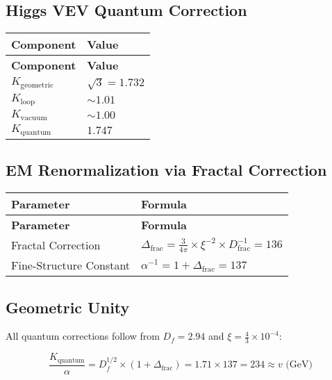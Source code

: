 \documentclass[12pt,a4paper]{article}
\begin{document}
	\subsection{Higgs VEV Quantum Correction}
	
	\begin{longtable}{|p{3cm}|p{4cm}|}
		\hline
		\textbf{Component} & \textbf{Value} \\
		\hline
		\endfirsthead
		\hline
		\textbf{Component} & \textbf{Value} \\
		\hline
		\endhead
		\(K_{\text{geometric}}\) & \(\sqrt{3} = 1.732\) \\
		\hline
		\(K_{\text{loop}}\) & \(\sim 1.01\) \\
		\hline
		\(K_{\text{vacuum}}\) & \(\sim 1.00\) \\
		\hline
		\(K_{\text{quantum}}\) & \(1.747\) \\
		\hline
	\end{longtable}
	
	\subsection{EM Renormalization via Fractal Correction}
	
	\begin{longtable}{|p{4cm}|p{5cm}|}
		\hline
		\textbf{Parameter} & \textbf{Formula} \\
		\hline
		\endfirsthead
		\hline
		\textbf{Parameter} & \textbf{Formula} \\
		\hline
		\endhead
		Fractal Correction & \(\Delta_{\text{frac}} = \frac{3}{4\pi} \times \xi^{-2} \times D_{\text{frac}}^{-1} = 136\) \\
		\hline
		Fine-Structure Constant & \(\alpha^{-1} = 1 + \Delta_{\text{frac}} = 137\) \\
		\hline
	\end{longtable}
	
	\subsection{Geometric Unity}
	
	All quantum corrections follow from \(D_f = 2.94\) and \(\xi = \frac{4}{3} \times 10^{-4}\):
	
	\begin{equation}
		\frac{K_{\text{quantum}}}{\alpha} = D_f^{1/2} \times (1 + \Delta_{\text{frac}}) = 1.71 \times 137 = 234 \approx v \text{ (GeV)}
	\end{equation}
	
\end{document}

